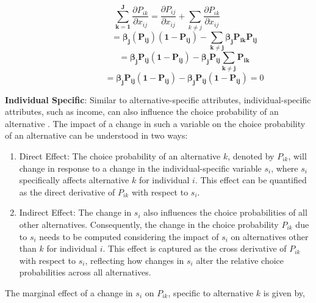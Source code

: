 \documentclass[a4paper,11pt]{article}
\begin{document}
        \begin{equation*}
            \qquad \mathbf{\sum_{k=1}^{J}}\dfrac{\partial P_{ik}}{\partial x_{ij}} = \dfrac{\partial P_{ij}}{\partial x_{ij}} + \sum_{k \neq j}\dfrac{\partial P_{ik}}{\partial x_{ij}}             
        \end{equation*}
        \begin{equation*}
            \qquad \qquad \qquad \mathbf{ = \beta_{j}(P_{ij})(1-P_{ij}) - \sum_{k \neq j}\beta_{j}P_{ik}P_{ij}}
        \end{equation*}
        \begin{equation*}
            \qquad \qquad \qquad \mathbf{ = \beta_{j}P_{ij}(1-P_{ij}) - \beta_{j}P_{ij} \sum_{k \neq j}P_{ik}}
        \end{equation*}
        \begin{equation*}
            \qquad \qquad \qquad \mathbf{ = \beta_{j}P_{ij}(1-P_{ij}) - \beta_{j}P_{ij}(1-P_{ij})} = 0
        \end{equation*}

    \textbf{Individual Specific}: Similar to alternative-specific attributes, individual-specific attributes, such as income, can also influence the choice probability of an alternative \cite{Koppelman&Bhat}. The impact of a change in such a variable on the choice probability of an alternative can be understood in two ways:

        \begin{enumerate}
            \item Direct Effect: The choice probability of an alternative $k$, denoted by $P_{ik}$, will change in response to a change in the individual-specific variable $s_{i}$, where $s_{i}$ specifically affects alternative $k$ for individual $i$. This effect can be quantified as the direct derivative of $P_{ik}$ with respect to $s_{i}$.

            \item Indirect Effect: The change in $s_{i}$ also influences the choice probabilities of all other alternatives. Consequently, the change in the choice probability $P_{ik}$ due to $s_{i}$ needs to be computed considering the impact of $s_{i}$ on alternatives other than $k$ for individual $i$. This effect is captured as the cross derivative of $P_{ik}$ with respect to $s_{i}$, reflecting how changes in $s_{i}$ alter the relative choice probabilities across all alternatives.
            \end{enumerate}

    The marginal effect of a change in $s_{i}$ on $P_{ik}$, specific to alternative $k$ is given by,
\end{document}
